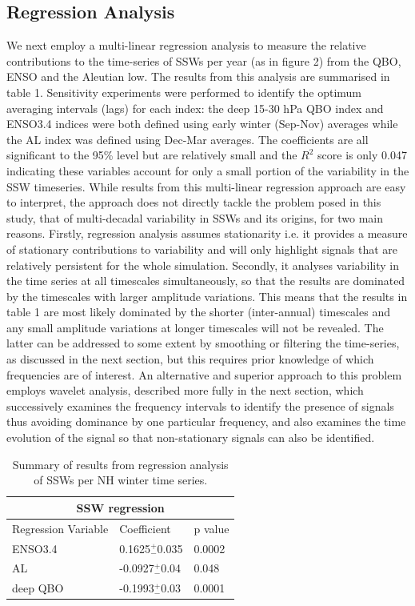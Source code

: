 \documentclass[wcd, manuscript]{copernicus}
\begin{document}
\subsection{Regression Analysis}
We next employ a multi-linear regression analysis to measure the relative contributions to the time-series of SSWs per year (as in figure 2)  from the QBO, ENSO and the Aleutian low. The results from this analysis are summarised in table 1.  Sensitivity experiments were performed to identify the optimum averaging intervals (lags) for each index: the deep 15-30 hPa QBO index and ENSO3.4 indices  were both defined using early winter (Sep-Nov) averages while the AL index was defined using Dec-Mar averages. The coefficients are all significant to the 95\% level but are relatively small and the $R^2$ score is only 0.047 indicating these variables account for only a small portion of the variability in the SSW timeseries. While results from this multi-linear regression approach are easy to interpret, the approach does not directly tackle the problem posed in this study, that of multi-decadal variability in SSWs and its origins, for two main reasons. Firstly, regression analysis assumes stationarity i.e. it provides a measure of stationary contributions to variability and will only highlight signals that are relatively persistent for the whole simulation. Secondly, it  analyses variability in the time series at all timescales simultaneously, so that the results are dominated by the timescales with larger amplitude variations.  This means that the results in table 1 are most likely dominated by the shorter (inter-annual) timescales and any small amplitude variations at longer timescales will not be revealed. The latter can be addressed to some extent by smoothing or filtering the time-series, as discussed in the next section, but this requires prior knowledge of which frequencies are of interest. An alternative and superior approach to this problem employs wavelet analysis, described more fully in the next section, which successively examines the frequency intervals to identify the presence of signals thus avoiding dominance by one particular frequency, and also examines the time evolution of the signal so that non-stationary signals can also be identified. 

\begin{table}[h!]
\centering
\begin{tabular}{|p{3cm}||p{3cm}|p{3cm}|}
 \hline
 \multicolumn{3}{|c|}{SSW regression}\\
 \hline
 Regression Variable& Coefficient& p value\\
 \hline
 ENSO3.4  & 0.1625$^+_-$0.035& 0.0002\\
 AL  &   -0.0927$^+_-$0.04  & 0.048\\
 deep QBO  & -0.1993$^+_-$0.03&0.0001\\
 \hline
 \end{tabular}
\begin{center}
\caption{Summary of results from regression analysis of SSWs per NH winter time series.}
\end{center}
\end{table}
\end{document}
